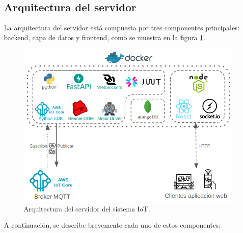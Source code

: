 
\subsection{Arquitectura del servidor}

La arquitectura del servidor está compuesta por tres componentes principales:
backend, capa de datos y frontend, como se muestra en la figura
\ref{fig:arquitectura servidor}.

\begin{figure}[H]
    \centering
    \includegraphics[width=.97\textwidth]{./Images/16.png}
    \caption{Arquitectura del servidor del sistema IoT.}
    \label{fig:arquitectura servidor}
\end{figure}

A continuación, se describe brevemente cada uno de estos componentes:

